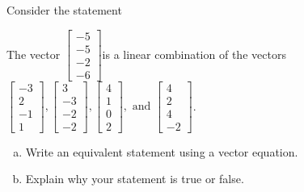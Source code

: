 
\begin{exerciseStatement}


Consider the statement 
\begin{center}\begin{minipage}{0.8\textwidth}
 The vector \( \left[\begin{array}{c}
-5 \\
-5 \\
-2 \\
-6
\end{array}\right] \)is a linear combination of the vectors \( \left[\begin{array}{c}
-3 \\
2 \\
-1 \\
1
\end{array}\right] , \left[\begin{array}{c}
3 \\
-3 \\
-2 \\
-2
\end{array}\right] , \left[\begin{array}{c}
4 \\
1 \\
0 \\
2
\end{array}\right] , \text{ and } \left[\begin{array}{c}
4 \\
2 \\
4 \\
-2
\end{array}\right] \). 
\end{minipage}\end{center}
    


\begin{enumerate}[(a)]
\item  Write an equivalent statement using a vector equation.
\item  Explain why your statement is true or false.
\end{enumerate}
    
\end{exerciseStatement}
    
